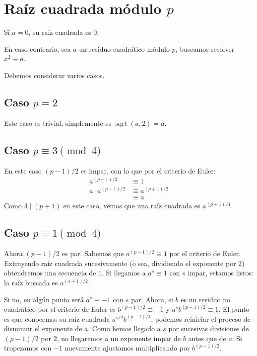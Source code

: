 \documentclass[english,spanish,fleqn]{article}
\begin{document}
\section{Raíz cuadrada módulo \(p\)}
\label{sec:sqrt-mod-p}

  Si \(a = 0\),
  su raíz cuadrada es \(0\).

  En caso contrario,
  sea \(a\) un residuo cuadrático módulo \(p\),
  buscamos resolver \(x^2 \equiv a\).

  Debemos considerar varios casos.

\subsection{Caso \(p = 2\)}
\label{sec:p=2}

  Este caso es trivial,
  simplemente es \(\operatorname{sqrt}(a, 2) = a\).

\subsection{Caso \(p \equiv 3 \pmod{4}\)}
\label{sec:p-equiv-3}

  En este caso \((p - 1) / 2\) es impar,
  con lo que por el criterio de Euler:
  \begin{align*}
    a^{(p - 1) / 2}
      &\equiv 1 \\
    a \cdot a^{(p - 1) / 2}
      &\equiv a^{(p + 1) / 2} \\
      &\equiv a
  \end{align*}
  Como \(4 \mid (p + 1)\) en este caso,
  vemos que una raíz cuadrada es \(a^{(p + 1) / 4}\).

\subsection{Caso \(p \equiv 1 \pmod{4}\)}
\label{sec:p-equiv-3}

  Ahora \((p - 1) / 2\) es par.
  Sabemos que \(a^{(p - 1) / 2} \equiv 1\) por el criterio de Euler.
  Extrayendo raíz cuadrada sucesivamente
  (o sea,
   dividiendo el exponente por \(2\))
  obtendremos una secuencia de \(1\).
  Si llegamos a \(a^s \equiv 1\) con \(s\) impar,
  estamos listos:
  la raíz buscada es \(a^{(s + 1) / 2}\).

  Si no,
  en algún punto será \(a^s \equiv -1\) con \(s\) par.
  Ahora,
  si \(b\) es un residuo no cuadrático
  por el criterio de Euler es \(b^{(p - 1) / 2} \equiv -1\)
  y \(a^s b^{(p - 1) / 2} \equiv 1\).
  El punto es que conocemos su raíz cuadrada
  \(a^{s / 2} b^{(p - 1) / 4}\),
  podemos reiniciar el proceso de disminuir el exponente de \(a\).
  Como hemos llegado a \(s\)
  por sucesivas divisiones de \((p - 1) / 2\) por \(2\),
  no llegaremos a un exponente impar de \(b\) antes que de \(a\).
  Si tropezamos con \(-1\)
  nuevamente ajustamos multiplicando por \(b^{(p - 1) / 2}\).
\end{document}
